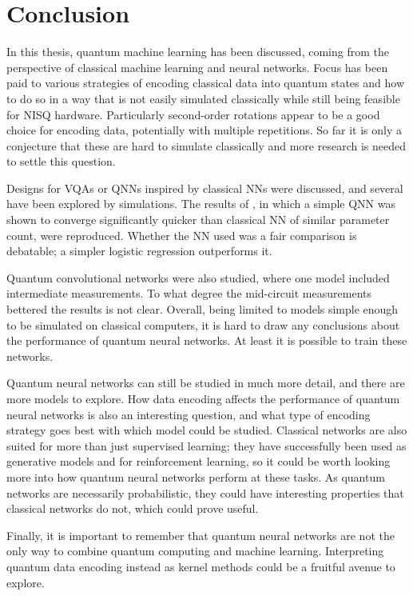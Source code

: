 \chapter{Conclusion}
\label{chap:conclusion}
In this thesis, quantum machine learning has been discussed, coming from the perspective of classical machine learning and neural networks.
Focus has been paid to various strategies of encoding classical data into quantum states and how to do so in a way that is not easily simulated classically while still being feasible for NISQ hardware.
Particularly second-order rotations appear to be a good choice for encoding data, potentially with multiple repetitions.
So far it is only a conjecture that these are hard to simulate classically and more research is needed to settle this question.

Designs for VQAs or QNNs inspired by classical NNs were discussed, and several have been explored by simulations.
The results of \cite{abbas2021}, in which a simple QNN was shown to converge significantly quicker than classical NN of similar parameter count, were reproduced.
Whether the NN used was a fair comparison is debatable; a simpler logistic regression outperforms it.

Quantum convolutional networks were also studied, where one model included intermediate measurements.
To what degree the mid-circuit measurements bettered the results is not clear.
Overall, being limited to models simple enough to be simulated on classical computers, it is hard to draw any conclusions about the performance of quantum neural networks.
At least it is possible to train these networks.

Quantum neural networks can still be studied in much more detail, and there are more models to explore.
How data encoding affects the performance of quantum neural networks is also an interesting question, and what type of encoding strategy goes best with which model could be studied.
Classical networks are also suited for more than just supervised learning; they have successfully been used as generative models and for reinforcement learning, so it could be worth looking more into how quantum neural networks perform at these tasks.
As quantum networks are necessarily probabilistic, they could have interesting properties that classical networks do not, which could prove useful.

Finally, it is important to remember that quantum neural networks are not the only way to combine quantum computing and machine learning.
Interpreting quantum data encoding instead as kernel methods could be a fruitful avenue to explore.
